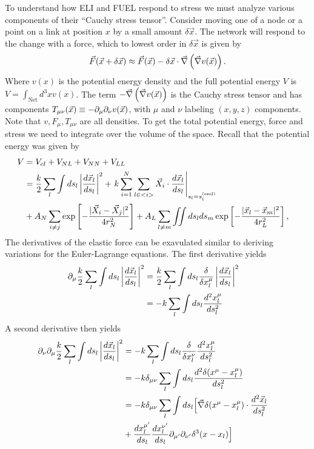 \documentclass[nofootinbib,preprint,floatfix,titlepage,superscriptaddress]{revtex4} %
\begin{document}
To understand how ELI and FUEL respond to stress we must analyze various components of their ``Cauchy stress tensor''. 
Consider moving one of a node or a point on a link at position $x$ by a small amount $\delta \vec{x}$.
The network will respond to the change with a force, which to lowest order in $\delta \vec{x}$ is given by
\begin{equation}
\vec{F} (\vec{x}+\delta \vec{x}) \approx %
\vec{F} (\vec{x})-\delta \vec{x}\cdot  \vec{\del} \pr{\vec{\del} v (\vec{x})}.\label{eq:dF}    
\end{equation}
Where $v(x)$ is the potential energy density and the full potential energy $V$ is $V = \int_\mathrm{Net} d^3x v(x)$. 
The term $-\vec{\nabla} \left(\vec{\nabla} v (\vec{x})\right)$ is the Cauchy stress tensor and has components $T_{\mu\nu}(\vec{x}) \equiv -\partial_\mu\partial_\nu v(\vec{x})$, with $\mu$ and $\nu$ labeling $(x,y,z)$ components. 
Note that $v,F_\mu,T_{\mu\nu}$ are all densities. 
To get the total potential energy, force and stress we need to integrate over the volume of the space. 
Recall that the potential energy was given by 
\begin{align}
    V &= V_{el} + V_{NL} +V_{NN} + V_{LL} \cr 
    &= {k\over 2}\sum_l\int ds_l \left|{d\vec{x}_l\over ds_l} \right|^2 + 
    \left. k\sum_{i=1}^N  \sum_{l\in <i>}  \vec{X}_i \cdot{d\vec{x}_l%
    \over ds_l}\right|_{s_l = s_l^{(\mathrm{end})}}
    \cr
    &+ A_N\sum_{i\ne j}  \exp\left[- {|\vec{X}_i-\vec{X}_j|^2 \over 4r_N^2}\right]+A_L\sum_{l\ne m} \iint ds_lds_m 
    \exp\left[- {|\vec{x}_l-\vec{x}_m|^2 \over 4 r_L^2}\right] ,
 \label{eq:Vfull1}
\end{align}
The derivatives of the elastic force can be exavulated similar to deriving variations for the Euler-Lagrange equations. 
The first derivative yields
\begin{align}
    \partial_\mu {k\over 2}\sum_l\int ds_l \left|{d\vec{x}_l\over ds_l} \right|^2 & = {k\over 2}\sum_l\int ds_l {\delta \over \delta x_l^\mu} \left|{d\vec{x}_l\over ds_l} \right|^2 \cr
    & = -{k}\sum_l\int ds_l {d^2 x_l^\mu\over ds_l^2} 
\end{align}
A second derivative then yields
\begin{align}
    \ro_\nu \ro_\mu {k\over 2}\sum_l\int ds_l \left|{d\vec{x}_l\over ds_l} \right|^2 
    & = -{k}\sum_l\int ds_l {\delta \over \delta x_l^\nu} {d^2 x_l^\mu\over ds_l^2} \cr 
    & = -{k}\delta_{\mu\nu} \sum_l\int ds_l {d^2 \delta(x^\mu-x_l^\mu )\over ds_l^2} \cr
    & = -{k}\delta_{\mu\nu} \sum_l\int ds_l\Big[ \vec{\del} \delta(x^\mu-x_l^\mu) \cdot {d^2 \vec{x}_l\over ds_l^2} \cr 
    & + {d x_l^{\mu'}\over ds_l}{d x_l^{\nu'}\over ds_l} \ro_{\mu'}\ro_{\nu'} \delta^3(x-x_l)  \Big] %
\end{align}
\end{document}
